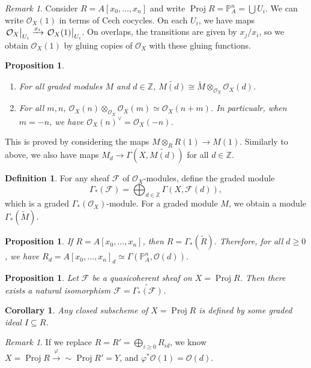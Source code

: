 \documentclass[leqno, openany]{memoir}
\newtheorem{cor}[thm]{Corollary}
\newtheorem{prop}[thm]{Proposition}
\theoremstyle{definition}
\newtheorem{defn}[thm]{Definition}
\theoremstyle{remark}
\newtheorem{rmk}[thm]{Remark}
\theoremstyle{plain}
\theoremstyle{definition}
\theoremstyle{remark}
\newcommand{\Z}{\mathbb{Z}}
\renewcommand{\P}{\mathbb{P}}
\newcommand{\mc}[1]{\mathcal{#1}}
\newcommand{\wt}[1]{\widetilde{#1}}
\DeclareMathOperator{\Proj}{Proj}
\begin{document}
\begin{rmk}
    Consider $R = A[x_0, \ldots, x_n]$ and write $\Proj R = \P^n_A = \bigcup U_i$. We can write $\mc{O}_X(1)$ in terms of Cech cocycles. On each $U_i$, we have maps $\eval{\mc{O}_X}_{U_i} \xrightarrow{x_i} \eval{\mc{O}_X(1)}_{U_i}$. On overlaps, the transitions are given by $x_j/x_i$, so we obtain $\mc{O}_X(1)$ by gluing copies of $\mc{O}_X$ with these gluing functions. 
\end{rmk}

\begin{prop}\leavevmode
    \begin{enumerate}
        \item For all graded modules $M$ and $d \in \Z$, $\wt{M(d)} \cong \wt{M} \otimes_{\mc{O}_X} \mc{O}_X(d)$.
        \item For all $m,n$, $\mc{O}_X(n) \otimes_{\mc{O}_X} \mc{O}_X(m) \simeq \mc{O}_X(n+m)$. In particualr, when $m = -n$, we have ${\mc{O}_X(n)}^{\vee} = \mc{O}_X(-n)$.
    \end{enumerate}
\end{prop}

This is proved by considering the maps $M \otimes_R R(1) \to M(1)$. Similarly to above, we also have maps $M_d \to \Gamma(X, \wt{M(d)})$ for all $d \in \Z$.

\begin{defn}
    For any sheaf $\mc{F}$ of $\mc{O}_X$-modules, define the graded module 
    \[ \Gamma_*(\mc{F}) = \bigoplus_{d \in \Z} \Gamma(X, \mc{F}(d)), \]
    which is a graded $\Gamma_*(\mc{O}_X)$-module. For a graded module $M$, we obtain a module $\Gamma_*(\wt{M})$.
\end{defn}

\begin{prop}
    If $R = A[x_0, \ldots, x_n]$, then $R = \Gamma_*(\wt{R})$. Therefore, for all $d \geq 0$, we have $R_d = {A[x_0,\ldots,x_n]}_d \simeq \Gamma(\P^n_A, \mc{O}(d))$.
\end{prop}

\begin{prop}
    Let $\mc{F}$ be a quasicoherent sheaf on $X = \Proj R$. Then there exists a natural isomorphism $\mc{F} = \wt{\Gamma_*(\mc{F})}$.
\end{prop}

\begin{cor}
    Any closed subscheme of $X = \Proj R$ is defined by some graded ideal $I \subseteq R$.
\end{cor}

\begin{rmk}
    If we replace $R = R' = \bigoplus_{i \geq 0} R_{id}$, we know $X = \Proj R \xrightarrow{\varphi}{\sim} \Proj R' = Y$, and $\varphi^*\mc{O}(1) = \mc{O}(d)$. 
\end{rmk}
\end{document}
